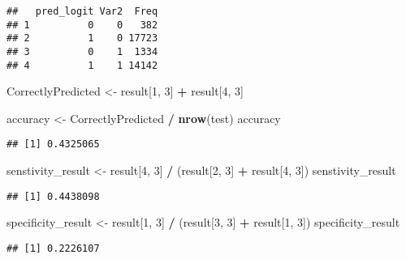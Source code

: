 \documentclass[]{article}
\newenvironment{Shaded}{\begin{snugshade}}{\end{snugshade}}
\newcommand{\KeywordTok}[1]{\textcolor[rgb]{0.13,0.29,0.53}{\textbf{#1}}}
\newcommand{\DecValTok}[1]{\textcolor[rgb]{0.00,0.00,0.81}{#1}}
\newcommand{\StringTok}[1]{\textcolor[rgb]{0.31,0.60,0.02}{#1}}
\newcommand{\OperatorTok}[1]{\textcolor[rgb]{0.81,0.36,0.00}{\textbf{#1}}}
\newcommand{\NormalTok}[1]{#1}
\begin{document}
\begin{verbatim}
##   pred_logit Var2  Freq
## 1          0    0   382
## 2          1    0 17723
## 3          0    1  1334
## 4          1    1 14142
\end{verbatim}

\begin{Shaded}
\begin{Highlighting}[]
\NormalTok{CorrectlyPredicted <-}\StringTok{ }\NormalTok{result[}\DecValTok{1}\NormalTok{, }\DecValTok{3}\NormalTok{] }\OperatorTok{+}\StringTok{ }\NormalTok{result[}\DecValTok{4}\NormalTok{, }\DecValTok{3}\NormalTok{]}

\NormalTok{accuracy <-}\StringTok{ }\NormalTok{CorrectlyPredicted }\OperatorTok{/}\StringTok{ }\KeywordTok{nrow}\NormalTok{(test)}
\NormalTok{accuracy}
\end{Highlighting}
\end{Shaded}

\begin{verbatim}
## [1] 0.4325065
\end{verbatim}

\begin{Shaded}
\begin{Highlighting}[]
\NormalTok{senstivity_result <-}\StringTok{ }\NormalTok{result[}\DecValTok{4}\NormalTok{, }\DecValTok{3}\NormalTok{] }\OperatorTok{/}\StringTok{ }\NormalTok{(result[}\DecValTok{2}\NormalTok{, }\DecValTok{3}\NormalTok{] }\OperatorTok{+}\StringTok{ }\NormalTok{result[}\DecValTok{4}\NormalTok{, }\DecValTok{3}\NormalTok{])}
\NormalTok{senstivity_result}
\end{Highlighting}
\end{Shaded}

\begin{verbatim}
## [1] 0.4438098
\end{verbatim}

\begin{Shaded}
\begin{Highlighting}[]
\NormalTok{specificity_result <-}\StringTok{ }\NormalTok{result[}\DecValTok{1}\NormalTok{, }\DecValTok{3}\NormalTok{] }\OperatorTok{/}\StringTok{ }\NormalTok{(result[}\DecValTok{3}\NormalTok{, }\DecValTok{3}\NormalTok{] }\OperatorTok{+}\StringTok{ }\NormalTok{result[}\DecValTok{1}\NormalTok{, }\DecValTok{3}\NormalTok{])}
\NormalTok{specificity_result}
\end{Highlighting}
\end{Shaded}

\begin{verbatim}
## [1] 0.2226107
\end{verbatim}
\end{document}
